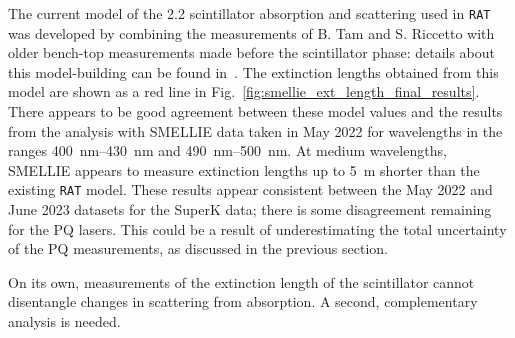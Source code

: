 The current model of the \SI{2.2}{\gpl} scintillator absorption and scattering used in \texttt{RAT} was developed by combining the measurements of B. Tam and S. Riccetto with older bench-top measurements made before the scintillator phase: details about this model-building can be found in~\cite{kaptanogluDocumentationAttenuationStudies2022,riccettoRATOptics2g2022}. %
The extinction lengths obtained from this model are shown as a red line in Fig.~\ref{fig:smellie_ext_length_final_results}. There appears to be good agreement between these model values and the results from the analysis with SMELLIE data taken in May 2022 for wavelengths in the ranges \SIrange{400}{430}{\nm} and \SIrange{490}{500}{\nm}. At medium wavelengths, SMELLIE appears to measure extinction lengths up to \SI{5}{\metre} shorter than the existing \texttt{RAT} model. These results appear consistent between the May 2022 and June 2023 datasets for the SuperK data; there is some disagreement remaining for the PQ lasers. This could be a result of underestimating the total uncertainty of the PQ measurements, as discussed in the previous section.

On its own, measurements of the extinction length of the scintillator cannot disentangle changes in scattering from absorption. A second, complementary analysis is needed.



